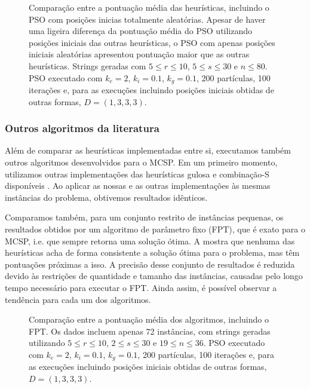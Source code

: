         \begin{figure}[htb]
            \centering

            \caption{Comparação entre a pontuação média das heurísticas, incluindo o PSO com posições inicias totalmente aleatórias. Apesar de haver uma ligeira diferença da pontuação média do PSO utilizando posições iniciais das outras heurísticas, o PSO com apenas posições iniciais aleatórias apresentou pontuação maior que as outras heurísticas. Strings geradas com $5 \leq r \leq 10$, $5 \leq s \leq 30$ e $n \leq 80$. PSO executado com $k_e = 2$, $k_i = 0.1$, $k_g = 0.1$, 200 partículas, 100 iterações e, para as execuções incluindo posições iniciais obtidas de outras formas, $D = (1, 3, 3, 3)$.}
            \label{fig:pso-puro}
        \end{figure}

    \subsubsection{Outros algoritmos da literatura}

        Além de comparar as heurísticas implementadas entre si, executamos também outros algoritmos desenvolvidos para o MCSP. Em um primeiro momento, utilizamos outras implementações das heurísticas gulosa e combinação-S disponíveis \cite{siqueira_signed_2023}. Ao aplicar as nossas e as outras implementações às mesmas instâncias do problema, obtivemos resultados idênticos.

        Comparamos também, para um conjunto restrito de instâncias pequenas, os resultados obtidos por um algoritmo de parâmetro fixo (FPT), que é exato para o MCSP, i.e. que sempre retorna uma solução ótima. A  mostra que nenhuma das heurísticas acha de forma consistente a solução ótima para o problema, mas têm pontuações próximas a isso. A precisão desse conjunto de resultados é reduzida devido às restrições de quantidade e tamanho das instâncias, causadas pelo longo tempo necessário para executar o FPT. Ainda assim, é possível observar a tendência para cada um dos algoritmos.

        \begin{figure}[htb]
            \centering

            \caption{Comparação entre a pontuação média dos algoritmos, incluindo o FPT. Os dados incluem apenas 72 instâncias, com strings geradas utilizando $5 \leq r \leq 10$, $2 \leq s \leq 30$ e $19 \leq n \leq 36$. PSO executado com $k_e = 2$, $k_i = 0.1$, $k_g = 0.1$, 200 partículas, 100 iterações e, para as execuções incluindo posições iniciais obtidas de outras formas, $D = (1, 3, 3, 3)$.}
            \label{fig:fpt}
        \end{figure}

